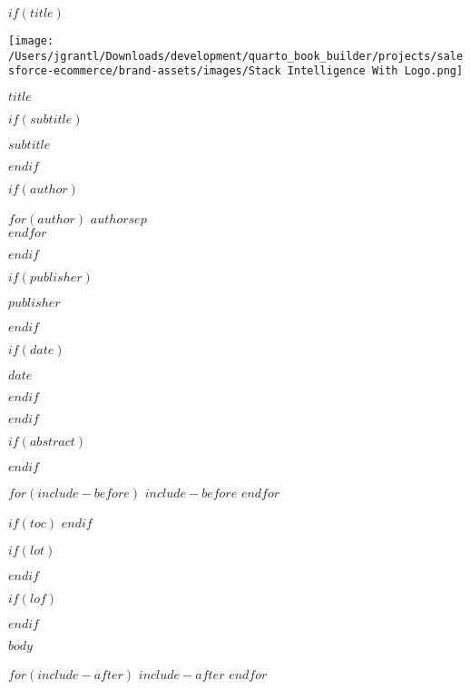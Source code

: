 \documentclass[$if(fontsize)$$fontsize$,$endif$$if(papersize)$$papersize$,$endif$$for(classoption)$$classoption$$sep$,$endfor$]{$documentclass$}
\renewcommand{\maketitle}{%
  \begin{titlepage}
    \centering
    \vspace*{2cm}
    
    \texttt{[image: /Users/jgrantl/Downloads/development/quarto\_book\_builder/projects/salesforce-ecommerce/brand-assets/images/Stack Intelligence With Logo.png]}\\[3cm]
    
    {\Huge\bfseries\color{primaryBlue} $title$\par}
    \vspace{1cm}
    
    $if(subtitle)$
    {\Large\color{secondaryText} $subtitle$\par}
    \vspace{1cm}
    $endif$
    
    $if(author)$
    {\large\color{secondaryText}
      $for(author)$
        $author$$sep$\\
      $endfor$
    \par}
    \vspace{0.5cm}
    $endif$
    
    $if(publisher)$
    {\large\color{secondaryText} $publisher$\par}
    $endif$
    
    $if(date)$
    {\large\color{secondaryText} $date$\par}
    $endif$
    
    \vfill
    
    \colorbox{primaryOrange}{\makebox[\textwidth][c]{\textcolor{white}{\large\bfseries Executive Guide}}}
  \end{titlepage}
}
\begin{document}
$if(title)$
\maketitle
$endif$

$if(abstract)$
\begin{abstract}
$abstract$
\end{abstract}
$endif$

$for(include-before)$
$include-before$
$endfor$

$if(toc)$
{
  \hypersetup{linkcolor=primaryBlue}
  \setcounter{tocdepth}{3}
  \tableofcontents
}
$endif$

$if(lot)$
\listoftables
$endif$

$if(lof)$
\listoffigures
$endif$

$body$

$for(include-after)$
$include-after$
$endfor$
\end{document}
